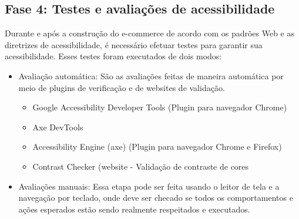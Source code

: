 \subsection{Fase 4: Testes e avaliações de acessibilidade}
{Durante e após a construção do e-commerce de acordo com os
padrões Web e as diretrizes de acessibilidade, é necessário efetuar testes para garantir sua acessibilidade. Esses testes foram executados de dois modos: 
\begin{itemize}
\item Avaliação automática: São as avaliações feitas de maneira automática por meio de plugins de verificação e de websites de validação.
\begin{itemize}
\item Google Accessibility Developer Tools (Plugin para navegador Chrome)
\item Axe DevTools 
\item Accessibility Engine (axe) (Plugin para navegador Chrome e Firefox)
\item Contrast Checker (website - Validação de contraste de cores
\end{itemize}
\item Avaliações manuais: Essa etapa pode ser feita usando o leitor de tela e a navegação por teclado, onde deve ser checado se todos os comportamentos e ações esperados estão sendo realmente respeitados e executados. 

\end{itemize}
}

